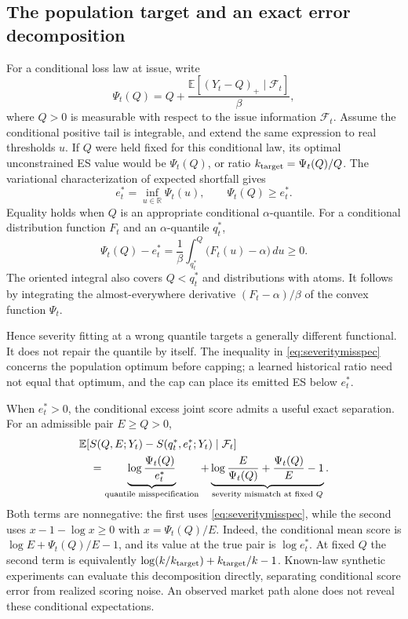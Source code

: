 \documentclass[11pt,a4paper]{article}
\theoremstyle{definition}\newtheorem{definition}[theorem]{Definition}
\begin{document}
\subsection{The population target and an exact error decomposition}
For a conditional loss law at issue, write
\begin{equation}
 \Psi_t(Q)=Q+\frac{\mathbb E[(Y_t-Q)_+\mid\mathcal F_t]}{\beta},
 \label{eq:severityfunctional}
\end{equation}
where $Q>0$ is measurable with respect to the issue information $\mathcal F_t$. Assume the conditional positive tail is integrable, and extend the same expression to real thresholds $u$. If $Q$ were held fixed for this conditional law, its optimal unconstrained ES value would be $\Psi_t(Q)$, or ratio $k_{\rm target}=\Psi_t(Q)/Q$. The variational characterization of expected shortfall \cite{rockafellar2002cvar} gives
\begin{equation}
 e_t^*=\inf_{u\in\mathbb R}\Psi_t(u),
 \qquad \Psi_t(Q)\ge e_t^*.
 \label{eq:severitymisspec}
\end{equation}
Equality holds when $Q$ is an appropriate conditional $\alpha$-quantile. For a conditional distribution function $F_t$ and an $\alpha$-quantile $q_t^*$,
\begin{equation}
 \Psi_t(Q)-e_t^*
 =\frac1\beta\int_{q_t^*}^{Q}\bigl(F_t(u)-\alpha\bigr)\,du
 \ge0.
 \label{eq:severityquantilegap}
\end{equation}
The oriented integral also covers $Q<q_t^*$ and distributions with atoms. It follows by integrating the almost-everywhere derivative $(F_t-\alpha)/\beta$ of the convex function $\Psi_t$.

Hence severity fitting at a wrong quantile targets a generally different functional. It does not repair the quantile by itself. The inequality in \eqref{eq:severitymisspec} concerns the population optimum before capping; a learned historical ratio need not equal that optimum, and the cap can place its emitted ES below $e_t^*$.

When $e_t^*>0$, the conditional excess joint score admits a useful exact separation. For an admissible pair $E\ge Q>0$,
\begin{align}
 &\mathbb E[S(Q,E;Y_t)-S(q_t^*,e_t^*;Y_t)\mid\mathcal F_t]\notag\\
 &\quad=\underbrace{\log\frac{\Psi_t(Q)}{e_t^*}}_{\text{quantile misspecification}}
 +\underbrace{\log\frac{E}{\Psi_t(Q)}+\frac{\Psi_t(Q)}{E}-1}_{\text{severity mismatch at fixed }Q}.
 \label{eq:severitydecomposition}
\end{align}
Both terms are nonnegative: the first uses \eqref{eq:severitymisspec}, while the second uses $x-1-\log x\ge0$ with $x=\Psi_t(Q)/E$. Indeed, the conditional mean score is $\log E+\Psi_t(Q)/E-1$, and its value at the true pair is $\log e_t^*$. At fixed $Q$ the second term is equivalently $\log(k/k_{\rm target})+k_{\rm target}/k-1$. Known-law synthetic experiments can evaluate this decomposition directly, separating conditional score error from realized scoring noise. An observed market path alone does not reveal these conditional expectations.
\end{document}
